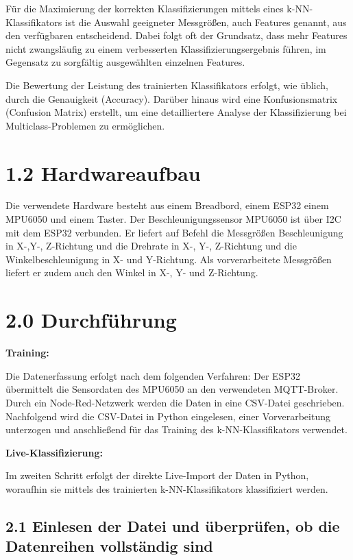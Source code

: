 \documentclass[11pt]{article}
\begin{document}
Für die Maximierung der korrekten Klassifizierungen mittels eines
k-NN-Klassifikators ist die Auswahl geeigneter Messgrößen, auch Features
genannt, aus den verfügbaren entscheidend. Dabei folgt oft der
Grundsatz, dass mehr Features nicht zwangsläufig zu einem verbesserten
Klassifizierungsergebnis führen, im Gegensatz zu sorgfältig ausgewählten
einzelnen Features.

Die Bewertung der Leistung des trainierten Klassifikators erfolgt, wie
üblich, durch die Genauigkeit (Accuracy). Darüber hinaus wird eine
Konfusionsmatrix (Confusion Matrix) erstellt, um eine detailliertere
Analyse der Klassifizierung bei Multiclass-Problemen zu ermöglichen.

    \hypertarget{hardwareaufbau}{%
\section*{1.2 Hardwareaufbau}\label{hardwareaufbau}}

    Die verwendete Hardware besteht aus einem Breadbord, einem ESP32 einem
MPU6050 und einem Taster. Der Beschleunigungssensor MPU6050 ist über I2C
mit dem ESP32 verbunden. Er liefert auf Befehl die Messgrößen
Beschleunigung in X-,Y-, Z-Richtung und die Drehrate in X-, Y-,
Z-Richtung und die Winkelbeschleunigung in X- und Y-Richtung. Als
vorverarbeitete Messgrößen liefert er zudem auch den Winkel in X-, Y-
und Z-Richtung.

    \hypertarget{durchfuxfchrung}{%
\section*{2.0 Durchführung}\label{durchfuxfchrung}}

    \textbf{Training:}

Die Datenerfassung erfolgt nach dem folgenden Verfahren: Der ESP32
übermittelt die Sensordaten des MPU6050 an den verwendeten MQTT-Broker.
Durch ein Node-Red-Netzwerk werden die Daten in eine CSV-Datei
geschrieben. Nachfolgend wird die CSV-Datei in Python eingelesen, einer
Vorverarbeitung unterzogen und anschließend für das Training des
k-NN-Klassifikators verwendet.

\textbf{Live-Klassifizierung:}

Im zweiten Schritt erfolgt der direkte Live-Import der Daten in Python,
woraufhin sie mittels des trainierten k-NN-Klassifikators klassifiziert
werden.

    \hypertarget{einlesen-der-datei-und-uxfcberpruxfcfen-ob-die-datenreihen-vollstuxe4ndig-sind}{%
\subsection*{2.1 Einlesen der Datei und überprüfen, ob die Datenreihen
vollständig
sind}\label{einlesen-der-datei-und-uxfcberpruxfcfen-ob-die-datenreihen-vollstuxe4ndig-sind}}
\end{document}
